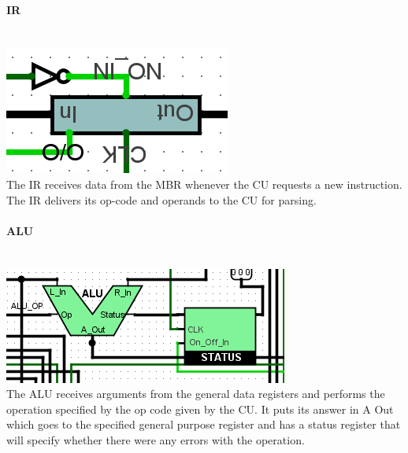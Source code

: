 \documentclass{article}
\begin{document}
	\paragraph{IR}~
	\\ \includegraphics[scale=0.5]{IR} \\ The IR receives data from the MBR whenever the CU requests a new instruction. The IR delivers its op-code and operands to the CU for parsing.
	\paragraph{ALU}~
	\\ \includegraphics[scale=0.5]{ALU} \\ The ALU receives arguments from the general data registers and performs the operation specified by the op code given by the CU. It puts its answer in A Out which goes to the specified general purpose register and has a status register that will specify whether there were any errors with the operation.
\end{document}
